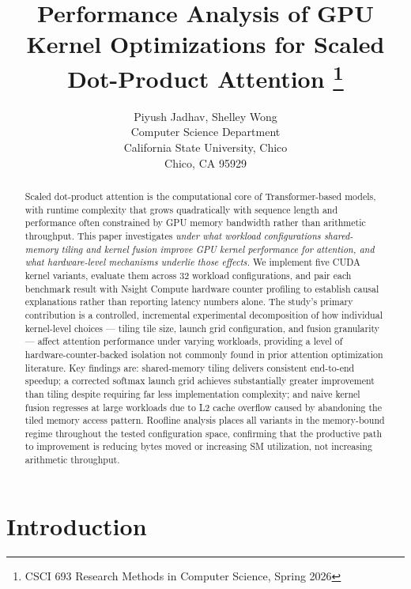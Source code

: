 \documentclass{article}
\title{Performance Analysis of GPU Kernel Optimizations for
  Scaled Dot-Product Attention%
  \footnote{CSCI 693 Research Methods in Computer Science, Spring 2026}}
\author{
  Piyush Jadhav\affmark[1], Shelley Wong\affmark[1]\\
  \affmark[1]Computer Science Department\\
  California State University, Chico\\
  Chico, CA 95929\\
  \email{\{pajadhav,swong26\}@csuchico.edu}
}
\begin{document}
\maketitle

\begin{abstract}

Scaled dot-product attention is the computational core of Transformer-based
models, with runtime complexity that grows quadratically with sequence length
and performance often constrained by GPU memory bandwidth rather than
arithmetic throughput. This paper investigates \textit{under what workload
configurations shared-memory tiling and kernel fusion improve GPU kernel
performance for attention, and what hardware-level mechanisms underlie those
effects.} We implement five CUDA kernel variants, evaluate them across 32
workload configurations, and pair each benchmark result with Nsight Compute
hardware counter profiling to establish causal explanations rather than
reporting latency numbers alone. The study's primary contribution is a
controlled, incremental experimental decomposition of how individual
kernel-level choices — tiling tile size, launch grid configuration, and
fusion granularity — affect attention performance under varying workloads,
providing a level of hardware-counter-backed isolation not commonly found in
prior attention optimization literature. Key findings are: shared-memory
tiling delivers consistent end-to-end speedup; a corrected softmax launch
grid achieves substantially greater improvement than tiling despite requiring
far less implementation complexity; and naive kernel fusion regresses at large
workloads due to L2 cache overflow caused by abandoning the tiled memory
access pattern. Roofline analysis places all variants in the memory-bound
regime throughout the tested configuration space, confirming that the
productive path to improvement is reducing bytes moved or increasing SM
utilization, not increasing arithmetic throughput.

\end{abstract}

\section{Introduction}
\end{document}
